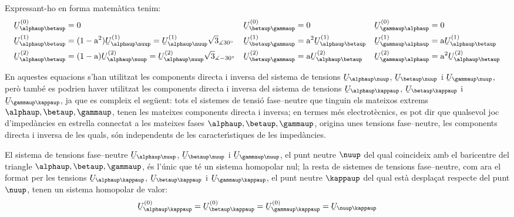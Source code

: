 Expressant-ho en forma matem\`{a}tica tenim:
\begin{subequations}
\begin{align}
   \cmplx{U}_{\alphaup\betaup}\ap{(0)} &= 0 &
   \cmplx{U}_{\betaup\gammaup}\ap{(0)} &= 0 &
   \cmplx{U}_{\gammaup\alphaup}\ap{(0)} &= 0 \\
   \cmplx{U}_{\alphaup\betaup}\ap{(1)} &= (1-\au^2) \cmplx{U}_{\alphaup\nuup}\ap{(1)} =
   \cmplx{U}_{\alphaup\nuup}\ap{(1)} \sqrt{3}_{\measuredangle 30\degree} &
   \cmplx{U}_{\betaup\gammaup}\ap{(1)} &= \au^2 \cmplx{U}_{\alphaup\betaup}\ap{(1)} &
   \cmplx{U}_{\gammaup\alphaup}\ap{(1)} &= \au \cmplx{U}_{\alphaup\betaup}\ap{(1)} \label{eq:c_sim_a3} \\
   \cmplx{U}_{\alphaup\betaup}\ap{(2)} &= (1-\au) \cmplx{U}_{\alphaup\nuup}\ap{(2)}  =
   \cmplx{U}_{\alphaup\nuup}\ap{(2)} \sqrt{3}_{\measuredangle -30\degree}&
   \cmplx{U}_{\betaup\gammaup}\ap{(2)} &= \au \cmplx{U}_{\alphaup\betaup}\ap{(2)} &
   \cmplx{U}_{\gammaup\alphaup}\ap{(2)} &= \au^2 \cmplx{U}_{\alphaup\betaup}\ap{(2)} \label{eq:c_sim_b3}
\end{align}
\end{subequations}

En aquestes equacions s'han utilitzat les components directa i
inversa del sistema de tensions
$\cmplx{U}_{\alphaup\nuup}$, $\cmplx{U}_{\betaup\nuup}$ i $\cmplx{U}_{\gammaup\nuup}$,
per\`{o} tamb\'{e} es podrien haver utilitzat les components directa i
inversa del sistema de tensions
$\cmplx{U}_{\alphaup\kappaup}$, $\cmplx{U}_{\betaup\kappaup}$ i $\cmplx{U}_{\gammaup\kappaup}$,
ja que es compleix el seg\"{u}ent: tots el sistemes de tensi\'{o}
fase--neutre que tinguin els mateixos extrems $\alphaup, \betaup,
\gammaup$, tenen les mateixes components directa i inversa; en termes
m\'{e}s electrot\`{e}cnics, es pot dir que qualsevol joc d'imped\`{a}ncies en
estrella connectat a les mateixes fases $\alphaup, \betaup, \gammaup$,
origina unes tensions fase--neutre, les components directa i inversa
de les quals, s\'{o}n independents de les caracter\'{\i}stiques de les
imped\`{a}ncies.

El sistema de tensions fase--neutre
$\cmplx{U}_{\alphaup\nuup}$, $\cmplx{U}_{\betaup\nuup}$ i $\cmplx{U}_{\gammaup\nuup}$,
el punt neutre $\nuup$ del qual coincideix amb el baricentre del
triangle $\alphaup, \betaup,
 \gammaup$, \'{e}s l'\'{u}nic que t\'{e} un sistema homopolar nul; la resta de sistemes de tensions
 fase--neutre, com ara el format per les tensions $\cmplx{U}_{\alphaup\kappaup}$, $\cmplx{U}_{\betaup\kappaup}$ i $\cmplx{U}_{\gammaup\kappaup}$,
 el punt neutre $\kappaup$ del qual est\`{a} despla\c{c}at respecte del punt $\nuup$, tenen un sistema
 homopolar de valor:
\begin{equation}
    \cmplx{U}_{\alphaup\kappaup}\ap{(0)} = \cmplx{U}_{\betaup\kappaup}\ap{(0)} =
    \cmplx{U}_{\gammaup\kappaup}\ap{(0)} = \cmplx{U}_{\nuup\kappaup}
\end{equation}

